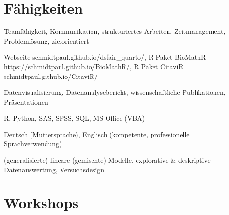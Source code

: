 \documentclass[11pt,a4paper,]{awesome-cv}
\begin{document}
\hypertarget{fuxe4higkeiten}{%
\section{Fähigkeiten}\label{fuxe4higkeiten}}

\begin{cvskills} 
{Teamfähigkeit, Kommunikation, strukturiertes Arbeiten, Zeitmanagement, Problemlösung, zielorientiert } 

{Webseite schmidtpaul.github.io/dsfair\_quarto/, R Paket BioMathR https://schmidtpaul.github.io/BioMathR/, R Paket CitaviR schmidtpaul.github.io/CitaviR/ } 

{Datenvisualisierung, Datenanalysebericht, wissenschaftliche Publikationen, Präsentationen } 

{R, Python, SAS, SPSS, SQL, MS Office (VBA) } 

{Deutsch (Muttersprache), Englisch (kompetente, professionelle Sprachverwendung) } 

{(generalisierte) lineare (gemischte) Modelle, explorative \& deskriptive Datenauswertung, Versuchsdesign } 
\end{cvskills}

\hypertarget{workshops}{%
\section{Workshops}\label{workshops}}
\end{document}
